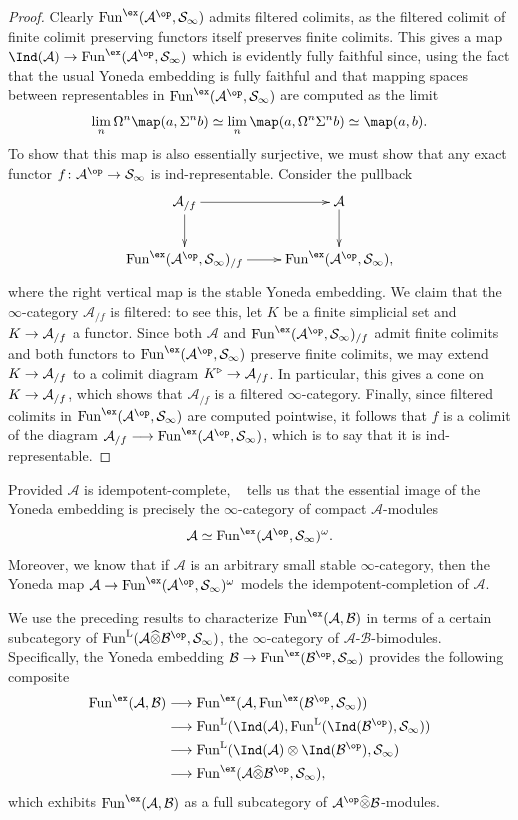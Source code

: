 \documentclass{amsart}
\newcommand{\htp}{\simeq}
\renewcommand{\to}{\mathchoice{\longrightarrow}{\rightarrow}{\rightarrow}{\rightarrow}}
\let\catsymbfont\mathcal
\newcommand{\aA}{{\catsymbfont{A}}}
\newcommand{\aB}{{\catsymbfont{B}}}
\newcommand{\aS}{{\catsymbfont{S}}}
\renewcommand{\L}{\mathrm{L}}
\newcommand{\idemtimes}{\widehat{\otimes}}
\newcommand{\Fun}{\mathrm{Fun}} %
\newcommand{\ispec}{\aS_{\infty}}
\renewcommand{\i}{\infty}
\numberwithin{equation}{section}
\theoremstyle{definition}
\begin{document}
\begin{proof}
Clearly $\Fun^{\ex}(\aA^{\op},\ispec)$ admits filtered colimits, as the
filtered colimit of finite colimit preserving functors itself
preserves finite colimits.  This gives a map
$\Ind(\aA)\to\Fun^{\ex}(\aA^{\op},\ispec)$ which is evidently fully
faithful since, using the fact that the usual Yoneda embedding is
fully faithful and that mapping spaces between representables in
$\Fun^{\ex}(\aA^{\op},\ispec)$ are computed as the limit 
\[
\lim_n\Omega^n\map(a,\Sigma^n b)\simeq\lim_n\map(a,\Omega^n\Sigma^n b)\simeq\map(a,b).
\]
To show that this map is also essentially surjective, we must show
that any exact functor $f\colon\aA^{\op}\to\ispec$ is ind-representable. 
Consider the pullback
\[
\xymatrix{\aA_{/f}\ar[r]\ar[d] & \aA\ar[d]\\
\Fun^{\ex}(\aA^{\op},\ispec)_{/f}\ar[r] & \Fun^{\ex}(\aA^{\op},\ispec),}
\]
where the right vertical map is the stable Yoneda embedding.
We claim that the $\i$-category $\aA_{/f}$ is filtered: to see this, let $K$ be
a finite simplicial set and $K\to\aA_{/f}$ a functor.  Since both
$\aA$ and $\Fun^{\ex}(\aA^{\op},\ispec)_{/f}$ admit finite colimits and
both functors to $\Fun^{\ex}(\aA^{\op},\ispec)$ preserve finite colimits,
we may extend $K\to\aA_{/f}$ to a colimit diagram
$K^\triangleright\to\aA_{/f}$.  In particular, this gives a cone on
$K\to\aA_{/f}$, which shows that $\aA_{/f}$ is a filtered
$\i$-category.  Finally, since filtered colimits in
$\Fun^{\ex}(\aA^{\op},\ispec)$ are computed pointwise, it follows that
$f$ is a colimit of the diagram
$\aA_{/f}\longrightarrow\Fun^{\ex}(\aA^{\op},\ispec)$, which is to say
that it is ind-representable.
\end{proof}

Provided $\aA$ is idempotent-complete, ~\cite[5.4.2.4]{HTT} tells us that the essential image of
the Yoneda embedding is precisely the $\infty$-category of compact $\aA$-modules  
\[
\aA \htp \Fun^{\ex}(\aA^{\op},\ispec)^{\omega}.
\]
Moreover, we know that if $\aA$ is an arbitrary small stable $\i$-category, then the Yoneda map $\aA \to \Fun^{\ex}(\aA^{\op},\ispec)^{\omega}$ models the idempotent-completion 
of $\aA$.

We use the preceding results to characterize $\Fun^{\ex}(\aA,\aB)$ in
terms of a certain subcategory of $\Fun^{\L}(\aA \idemtimes
\aB^{\op}, \ispec)$, the $\i$-category of $\aA$-$\aB$-bimodules.  Specifically,
the Yoneda embedding $\aB \to \Fun^{\ex}(\aB^{\op},\ispec)$ provides the
following composite
\begin{align*}
\Fun^{\ex}(\aA, \aB)
&\to \Fun^{\ex}(\aA, \Fun^{\ex}(\aB^{\op},\ispec)) \\
&\to \Fun^{\L}(\Ind(\aA), \Fun^{\L}(\Ind(\aB^{\op}), \ispec)) \\
&\to \Fun^{\L}(\Ind(\aA) \otimes \Ind(\aB^{\op}), \ispec) \\
&\to \Fun^{\ex}(\aA \idemtimes \aB^{\op}, \ispec),
\end{align*}
which exhibits $\Fun^{\ex}(\aA, \aB)$ as a full subcategory of
$\aA^{\op} \idemtimes \aB$-modules.
\end{document}
